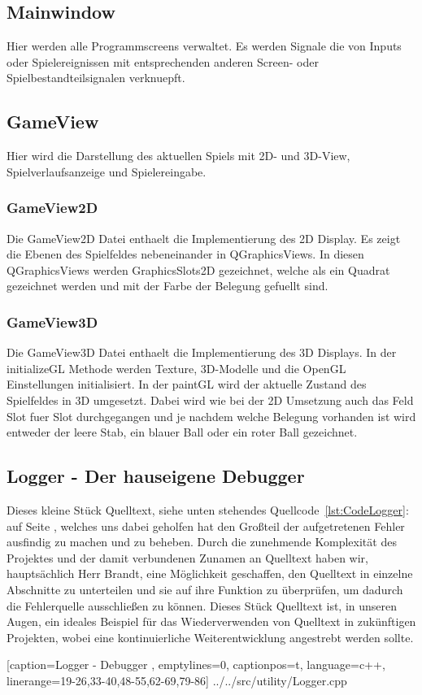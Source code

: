 \documentclass[a4paper]{scrartcl}
\begin{document}
\subsection{Mainwindow}\label{ch:Mainwindow}
Hier werden alle Programmscreens verwaltet. Es werden Signale die von Inputs oder Spielereignissen mit entsprechenden anderen Screen- oder Spielbestandteilsignalen verknuepft.
\subsection{GameView}\label{ch:GameView}
Hier wird die Darstellung des aktuellen Spiels mit 2D- und 3D-View, Spielverlaufsanzeige und Spielereingabe.
\subsubsection{GameView2D}\label{ch:GameView2D}
Die GameView2D Datei enthaelt die Implementierung des 2D Display. Es zeigt die Ebenen des Spielfeldes nebeneinander in QGraphicsViews. In diesen QGraphicsViews werden GraphicsSlots2D gezeichnet, welche als ein Quadrat gezeichnet
werden und mit der Farbe der Belegung gefuellt sind.
\subsubsection{GameView3D}\label{ch:GameView3D}
Die GameView3D Datei enthaelt die Implementierung des 3D Displays. In der initializeGL Methode werden Texture, 3D-Modelle und die OpenGL Einstellungen initialisiert. In der paintGL wird der aktuelle Zustand des Spielfeldes
in 3D umgesetzt. Dabei wird wie bei der 2D Umsetzung auch das Feld Slot fuer Slot durchgegangen und je nachdem welche Belegung vorhanden ist wird entweder der leere Stab, ein blauer Ball oder ein roter Ball gezeichnet. 

\newpage
\subsection{Logger - Der hauseigene Debugger}\label{ch:Logger}
Dieses kleine Stück Quelltext, siehe unten stehendes Quellcode~\ref{lst:CodeLogger}: auf Seite \pageref{lst:CodeLogger}, welches uns dabei geholfen hat den Großteil der aufgetretenen Fehler ausfindig zu machen und zu beheben. Durch die zunehmende Komplexität des Projektes und der damit verbundenen Zunamen an Quelltext haben wir, hauptsächlich Herr Brandt, eine Möglichkeit geschaffen, den Quelltext in einzelne Abschnitte zu unterteilen und sie auf ihre Funktion zu überprüfen, um dadurch die Fehlerquelle ausschließen zu können. Dieses Stück Quelltext ist, in unseren Augen, ein ideales Beispiel für das Wiederverwenden von Quelltext in zukünftigen Projekten, wobei eine kontinuierliche Weiterentwicklung angestrebt werden sollte.

    [caption={Logger - Debugger} 	%
    	\label{lst:CodeLogger},			%
    emptylines=0,					%
    captionpos=t,					%
    language=c++,					%
    linerange={19-26,33-40,48-55,62-69,79-86}]%
{../../src/utility/Logger.cpp}		%
\end{document}
